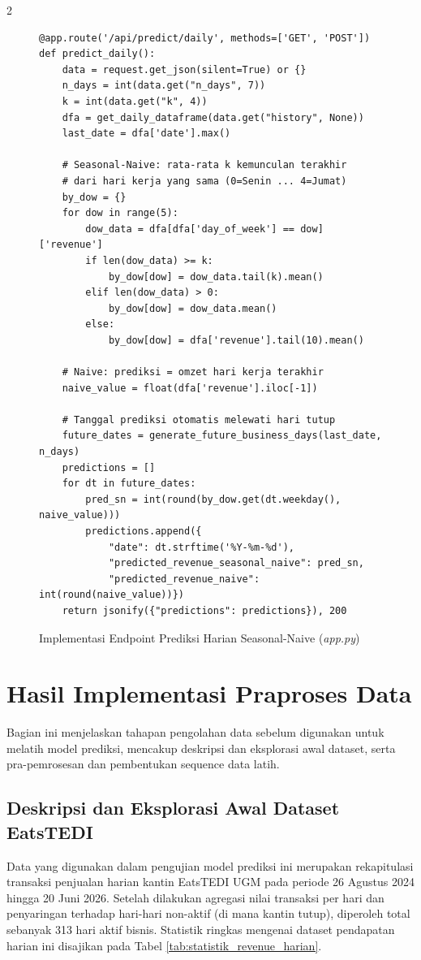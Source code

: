 \documentclass[12pt, a4paper, onecolumn, oneside]{report}
\begin{document}
\begin{spacing}{2}
\begin{figure}[H]
\begin{lstlisting}
@app.route('/api/predict/daily', methods=['GET', 'POST'])
def predict_daily():
    data = request.get_json(silent=True) or {}
    n_days = int(data.get("n_days", 7))
    k = int(data.get("k", 4))
    dfa = get_daily_dataframe(data.get("history", None))
    last_date = dfa['date'].max()

    # Seasonal-Naive: rata-rata k kemunculan terakhir
    # dari hari kerja yang sama (0=Senin ... 4=Jumat)
    by_dow = {}
    for dow in range(5):
        dow_data = dfa[dfa['day_of_week'] == dow]['revenue']
        if len(dow_data) >= k:
            by_dow[dow] = dow_data.tail(k).mean()
        elif len(dow_data) > 0:
            by_dow[dow] = dow_data.mean()
        else:
            by_dow[dow] = dfa['revenue'].tail(10).mean()

    # Naive: prediksi = omzet hari kerja terakhir
    naive_value = float(dfa['revenue'].iloc[-1])

    # Tanggal prediksi otomatis melewati hari tutup
    future_dates = generate_future_business_days(last_date, n_days)
    predictions = []
    for dt in future_dates:
        pred_sn = int(round(by_dow.get(dt.weekday(), naive_value)))
        predictions.append({
            "date": dt.strftime('%Y-%m-%d'),
            "predicted_revenue_seasonal_naive": pred_sn,
            "predicted_revenue_naive": int(round(naive_value))})
    return jsonify({"predictions": predictions}), 200
\end{lstlisting}
\caption{Implementasi Endpoint Prediksi Harian Seasonal-Naive (\textit{app.py})}
\label{fig:flask_daily}
\end{figure}

\section{Hasil Implementasi Praproses Data}

Bagian ini menjelaskan tahapan pengolahan data sebelum digunakan untuk melatih model prediksi, mencakup deskripsi dan eksplorasi awal dataset, serta pra-pemrosesan dan pembentukan sequence data latih.

\subsection{Deskripsi dan Eksplorasi Awal Dataset EatsTEDI}

Data yang digunakan dalam pengujian model prediksi ini merupakan rekapitulasi transaksi penjualan harian kantin EatsTEDI UGM pada periode 26 Agustus 2024 hingga 20 Juni 2026. Setelah dilakukan agregasi nilai transaksi per hari dan penyaringan terhadap hari-hari non-aktif (di mana kantin tutup), diperoleh total sebanyak 313 hari aktif bisnis. Statistik ringkas mengenai dataset pendapatan harian ini disajikan pada Tabel \ref{tab:statistik_revenue_harian}.


\end{spacing}
\end{document}
